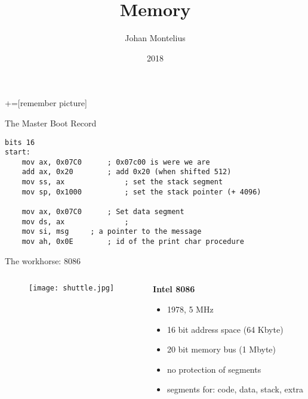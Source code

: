 \documentclass[aspectratio=169,12pt,handout]{beamer}
\author{Johan Montelius}
\institute{KTH}
\date{2018}
\title[\course]{Memory}
\begin{document}
+=[remember picture]


\begin{frame}
\titlepage
\end{frame}


\begin{frame}[fragile]{The Master Boot Record}

\begin{lstlisting}[language={[x86masm]Assembler}]
bits 16
start:
	mov ax, 0x07C0		; 0x07c00 is were we are
	add ax, 0x20		; add 0x20 (when shifted 512)
	mov ss, ax              ; set the stack segment 
	mov sp, 0x1000          ; set the stack pointer (+ 4096)

	mov ax, 0x07C0		; Set data segment
	mov ds, ax              ;
	mov si, msg		; a pointer to the message
	mov ah, 0x0E		; id of the print char procedure
\end{lstlisting}
  
\end{frame}


\begin{frame}{The workhorse: 8086}

  \begin{columns}
    \begin{column}{0.5\textwidth}
  \begin{figure}[]
    \centering
    \texttt{[image: shuttle.jpg]}
  \end{figure}
    \end{column}
    \begin{column}{0.5\textwidth}
      {\bf Intel 8086}
      \begin{itemize}
        \item 1978, 5 MHz
        \item 16 bit address space (64 Kbyte)
        \item 20 bit memory bus (1 Mbyte)
        \item no protection of segments
        \item segments for: code, data, stack, extra
      \end{itemize}
    \end{column}
  \end{columns}

\end{frame}
\end{document}
